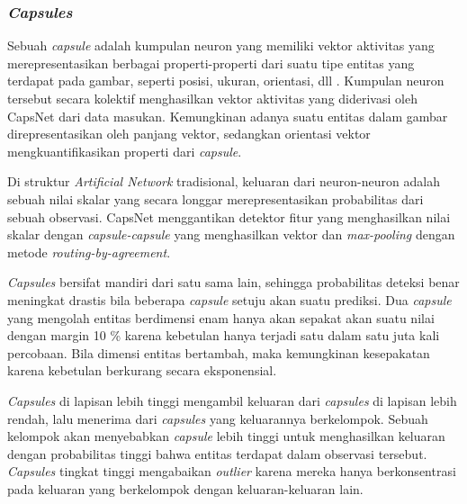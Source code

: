 \documentclass{article}
\begin{document}
	   	\subsubsection{\textit{Capsules}}
	   	Sebuah \textit{capsule} adalah kumpulan neuron yang memiliki vektor aktivitas yang merepresentasikan berbagai properti-properti dari suatu tipe entitas yang terdapat pada gambar, seperti posisi, ukuran, orientasi, dll \cite{hinton}. Kumpulan neuron tersebut secara kolektif menghasilkan vektor aktivitas yang diderivasi oleh CapsNet dari data masukan. Kemungkinan adanya suatu entitas dalam gambar direpresentasikan oleh panjang vektor, sedangkan orientasi vektor mengkuantifikasikan properti dari \textit{capsule}. 
	   	\par
	   	Di struktur \textit{Artificial Network} tradisional, keluaran dari neuron-neuron adalah sebuah nilai skalar yang secara longgar merepresentasikan probabilitas dari sebuah observasi. CapsNet menggantikan detektor fitur yang menghasilkan nilai skalar dengan \textit{capsule-capsule} yang menghasilkan vektor dan \textit{max-pooling} dengan metode \textit{routing-by-agreement}. 
	   	\par
	   	\textit{Capsules} bersifat mandiri dari satu sama lain, sehingga probabilitas deteksi benar meningkat drastis bila beberapa \textit{capsule} setuju akan suatu prediksi. Dua \textit{capsule} yang mengolah entitas berdimensi enam hanya akan sepakat akan suatu nilai dengan margin 10 \% karena kebetulan hanya terjadi satu dalam satu juta kali percobaan. Bila dimensi entitas bertambah, maka kemungkinan kesepakatan karena kebetulan berkurang secara eksponensial. 
	   	\par
	   	\textit{Capsules} di lapisan lebih tinggi mengambil keluaran dari \textit{capsules} di lapisan lebih rendah, lalu menerima dari \textit{capsules} yang keluarannya berkelompok. Sebuah kelompok akan menyebabkan \textit{capsule} lebih tinggi untuk menghasilkan keluaran dengan probabilitas tinggi bahwa entitas terdapat dalam observasi tersebut. \textit{Capsules} tingkat tinggi mengabaikan \textit{outlier} karena mereka hanya berkonsentrasi pada keluaran yang berkelompok dengan keluaran-keluaran lain.
	   	
\end{document}
